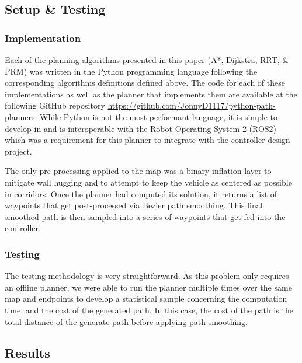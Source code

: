 \subsection{Setup \& Testing}


\newline

\subsubsection{Implementation}
\newline

Each of the planning algorithms presented in this paper (A*, Dijkstra, RRT, \& PRM) was written in the Python programming language following the corresponding algorithms definitions defined above. The code for each of these implementations as well as the planner that implements them are available at the following GitHub repository \url{https://github.com/JonnyD1117/python-path-planners}. While Python is not the most performant language, it is simple to develop in and is interoperable with the Robot Operating System 2 (ROS2) which was a requirement for this planner to integrate with the controller design project.

The only pre-processing applied to the map was a binary inflation layer to mitigate wall hugging and to attempt to keep the vehicle as centered as possible in corridors. Once the planner had computed its solution, it returns a list of waypoints that get post-processed via Bezier path smoothing. This final smoothed path is then sampled into a series of waypoints that get fed into the controller.
\newline
\subsubsection{Testing}

The testing methodology is very straightforward. As this problem only requires an offline planner, we were able to run the planner multiple times over the same map and endpoints to develop a statistical sample concerning the computation time, and the cost of the generated path. In this case, the cost of the path is the total distance of the generate path before applying path smoothing. 
\newline

\subsection{Results}

